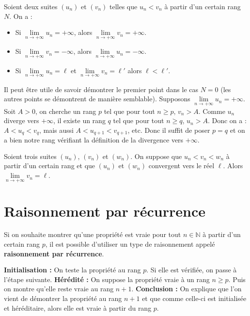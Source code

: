 	\begin{formula}
		Soient deux suites $(u_n)$ et $(v_n)$ telles que $u_n < v_n$ à partir d'un certain rang $N$. On a :
		\begin{itemize}
			\item Si $\lim\limits_{n \rightarrow +\infty} u_n = +\infty$, alors $\lim\limits_{n \rightarrow +\infty} v_n = +\infty$.
			\item Si $\lim\limits_{n \rightarrow +\infty} v_n = -\infty$, alors $\lim\limits_{n \rightarrow +\infty} u_n = -\infty$.
			\item Si $\lim\limits_{n \rightarrow +\infty} u_n = \ell$ et $\lim\limits_{n \rightarrow +\infty} v_n = \ell'$ alors $\ell < \ell'$.
		\end{itemize}
	\end{formula}

	\begin{demonstration}
		Il peut être utile de savoir démontrer le premier point dans le cas $N = 0$ (les autres points se démontrent de manière semblable). Supposons $\lim\limits_{n \rightarrow +\infty} u_n = +\infty$. Soit $A > 0$, on cherche un rang $p$ tel que pour tout $n \geq p$, $v_n > A$.
		\newpar
		Comme $u_n$ diverge vers $+\infty$, il existe un rang $q$ tel que pour tout $n \geq q$, $u_n > A$. Donc on a : $A < u_q < v_q$, mais aussi $A < u_{q+1} < v_{q+1}$, etc.
		\newpar
		Donc il suffit de poser $p = q$ et on a bien notre rang vérifiant la définition de la divergence vers $+\infty$.
	\end{demonstration}

	\begin{formula}
		Soient trois suites $(u_n)$, $(v_n)$ et $(w_n)$. On suppose que $u_n < v_n < w_n$ à partir d'un certain rang et que $(u_n)$ et $(w_n)$ convergent vers le réel $\ell$.
		\newpar
		Alors $\lim\limits_{n \rightarrow +\infty} v_n = \ell$.
	\end{formula}

	\section{Raisonnement par récurrence}

	Si on souhaite montrer qu'une propriété est vraie pour tout $n \in \mathbb{N}$ à partir d'un certain rang $p$, il est possible d'utiliser un type de raisonnement appelé \textbf{raisonnement par récurrence}.

	\begin{formula}
		\textbf{Initialisation :} On teste la propriété au rang $p$. Si elle est vérifiée, on passe à l'étape suivante.
		\newpar
		\textbf{Hérédité :} On suppose la propriété vraie à un rang $n \geq p$. Puis on montre qu'elle reste vraie au rang $n+1$.
		\newpar
		\textbf{Conclusion :} On explique que l'on vient de démontrer la propriété au rang $n+1$ et que comme celle-ci est initialisée et héréditaire, alors elle est vraie à partir du rang $p$.
	\end{formula}

